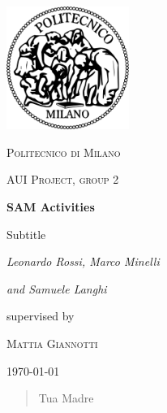 \documentclass[11pt,a4paper,oneside,openany]{report}
\begin{document}
	
	
\begin{titlepage}
	\centering
	\includegraphics[width=0.30\textwidth]{images/logopm.png}\par\vspace{1cm}
	{\scshape\LARGE Politecnico di Milano \par}
	\vspace{1cm}
	{\scshape\Large AUI Project, group 2\par}
	\vspace{1.5cm}
	{\huge\bfseries SAM Activities\par}
	\vspace{0.3cm}
	{\Large Subtitle\par}
	
	\vspace{2cm}
	

	{\Large\itshape Leonardo Rossi, Marco Minelli\par}
	{\Large\itshape and Samuele Langhi}

	\vfill

	supervised by\par
	\textsc{Mattia Giannotti}
	
	\vfill
	
	{\Large \today\par}
	
	\newpage
	
	\begin{abstract}
		Tua Madre
	\end{abstract}
\end{titlepage}
	
	\tableofcontents
	
	
	
	
	
	
	
	
	
	
	
	\cleardoublepage
	
	
	
\end{document}
